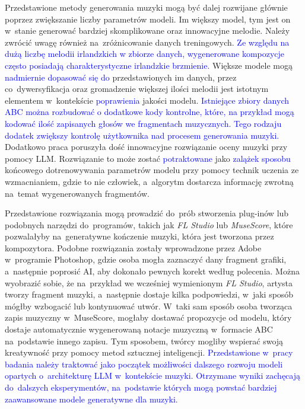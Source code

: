 \documentclass[data-science]{agh-wi} %
\begin{document}
Przedstawione metody generowania muzyki mogą być dalej rozwijane głównie poprzez zwiększanie liczby parametrów modeli. Im większy model, tym jest on w~stanie generować bardziej skomplikowane oraz innowacyjne melodie. Należy zwrócić uwagę również na~zróżnicowanie danych treningowych. \textcolor{blue}{Ze względu na dużą liczbę melodii irlandzkich w zbiorze danych, wygenerowane kompozycje często posiadają charakterystyczne irlandzkie brzmienie.} Większe modele mogą \textcolor{blue}{nadmiernie dopasować się do} przedstawionych im danych, przez co~dywersyfikacja oraz gromadzenie większej ilości melodii jest istotnym elementem w~kontekście \textcolor{blue}{poprawienia} jakości modelu. \textcolor{blue}{Istniejące zbiory danych ABC można rozbudować o dodatkowe kody kontrolne, które, na przykład mogą kodować ilość zapisanych głosów we fragmentach muzycznych. Tego rodzaju dodatek zwiększy kontrolę użytkownika nad procesem generowania muzyki.} Dodatkowo praca poruszyła dość innowacyjne rozwiązanie oceny muzyki przy pomocy LLM. Rozwiązanie to może zostać \textcolor{blue}{potraktowane} jako \textcolor{blue}{zalążek sposobu} końcowego dotrenowywania parametrów modelu przy pomocy technik uczenia ze wzmacnianiem, gdzie to nie człowiek, a~algorytm dostarcza informację zwrotną na~temat wygenerowanych fragmentów.

Przedstawione rozwiązania mogą prowadzić do~prób stworzenia plug-inów lub podobnych narzędzi do~programów, takich jak \textit{FL Studio} lub \textit{MuseScore}, które pozwalałyby na~generatywne kończenie muzyki, która jest tworzona przez kompozytora. Podobne rozwiązania zostały wprowadzone przez Adobe w~programie Photoshop, gdzie osoba mogła zaznaczyć dany fragment grafiki, a~następnie poprosić AI, aby dokonało pewnych korekt według polecenia. Można wyobrazić sobie, że na~przykład we wcześniej wymienionym \textit{FL Studio}, artysta tworzy fragment muzyki, a~następnie dostaje kilka podpowiedzi, w~jaki sposób mógłby wzbogacić lub kontynuować utwór. W~taki sam sposób osoba tworząca zapis muzyczny w~MuseScore, mogłaby dostawać propozycje od modelu, który dostaje automatycznie wygenerowaną notacje muzyczną w~formacie ABC na~podstawie innego zapisu. Tym sposobem, twórcy mogliby wspierać swoją kreatywność przy pomocy metod sztucznej inteligencji. \textcolor{blue}{Przedstawione w~pracy badania należy traktować jako początek możliwości dalszego rozwoju modeli opartych o~architekturę LLM w~kontekście muzyki. Otrzymane wyniki zachęcają do~dalszych eksperymentów, na~podstawie których mogą powstać bardziej zaawansowane modele generatywne dla muzyki.}
\end{document}
